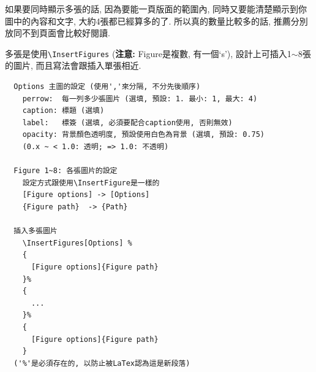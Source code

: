 \newpage
{}

  如果要同時顯示多張的話, 因為要能一頁版面的範圍內, 同時又要能清楚顯示到你圖中的內容和文字, 大約4張都已經算多的了. 所以真的數量比較多的話, 推薦分別放同不到頁面會比較好閱讀.

  多張是使用\verb|\InsertFigures| ({\bf 注意:} Figure是複數, 有一個`s'), 設計上可插入1$\sim$8張的圖片, 而且寫法會跟插入單張相近.\\

  \begin{DescriptionFrame}
  \begin{verbatim}
  Options 主圖的設定 (使用','來分隔, 不分先後順序)
    perrow:  每一列多少張圖片 (選填, 預設: 1. 最小: 1, 最大: 4)
    caption: 標題 (選填)
    label:   標簽 (選填, 必須要配合caption使用, 否則無效)
    opacity: 背景顏色透明度, 預設使用白色為背景 (選填, 預設: 0.75)
    (0.x ~ < 1.0: 透明; => 1.0: 不透明)

  Figure 1~8: 各張圖片的設定
    設定方式跟使用\InsertFigure是一樣的
    [Figure options] -> [Options]
    {Figure path}  -> {Path}

  插入多張圖片
    \InsertFigures[Options] %
    {
      [Figure options]{Figure path}
    }%
    {
      ...
    }%
    {
      [Figure options]{Figure path}
    }
  ('%'是必須存在的, 以防止被LaTex認為這是新段落)
  \end{verbatim}
  \end{DescriptionFrame}

  \newpage

